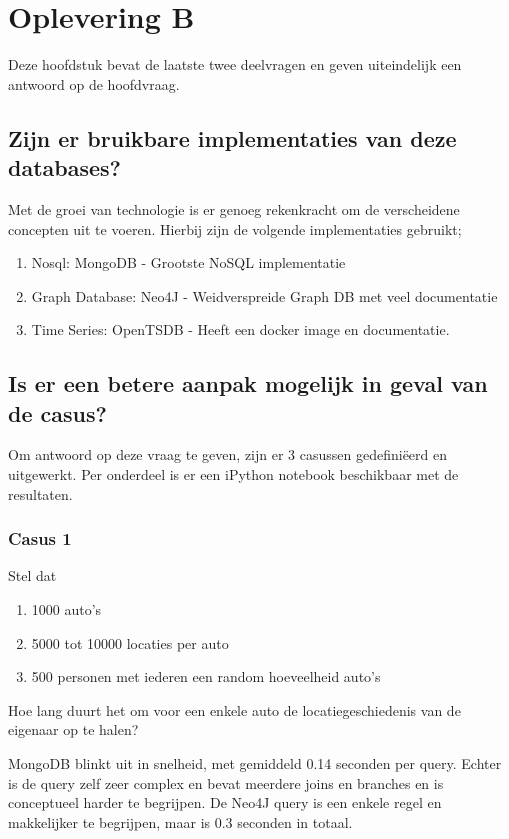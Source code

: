 \chapter{Oplevering B}

Deze hoofdstuk bevat de laatste twee deelvragen en geven uiteindelijk een antwoord op de hoofdvraag.

\section{Zijn er bruikbare implementaties van deze databases?}

Met de groei van technologie is er genoeg rekenkracht om de verscheidene concepten uit te voeren. Hierbij zijn de volgende implementaties gebruikt;

\begin{enumerate}
	\item Nosql: MongoDB - Grootste NoSQL implementatie
	\item Graph Database: Neo4J - Weidverspreide Graph DB met veel documentatie
	\item Time Series: OpenTSDB - Heeft een docker image en documentatie.
\end{enumerate}

\section{Is er een betere aanpak mogelijk in geval van de casus?}

Om antwoord op deze vraag te geven, zijn er 3 casussen gedefini\"eerd en uitgewerkt. Per onderdeel is er een iPython notebook beschikbaar met de resultaten.

\subsection{Casus 1}

Stel dat

\begin{enumerate}
	\item 1000 auto's
	\item 5000 tot 10000 locaties per auto
	\item 500 personen met iederen een random hoeveelheid auto's
\end{enumerate}

Hoe lang duurt het om voor een enkele auto de locatiegeschiedenis van de eigenaar op te halen?

MongoDB blinkt uit in snelheid, met gemiddeld 0.14 seconden per query. Echter is de query zelf zeer complex en bevat meerdere joins en branches en is conceptueel harder te begrijpen. De Neo4J query is een enkele regel en makkelijker te begrijpen, maar is 0.3 seconden in totaal. 

